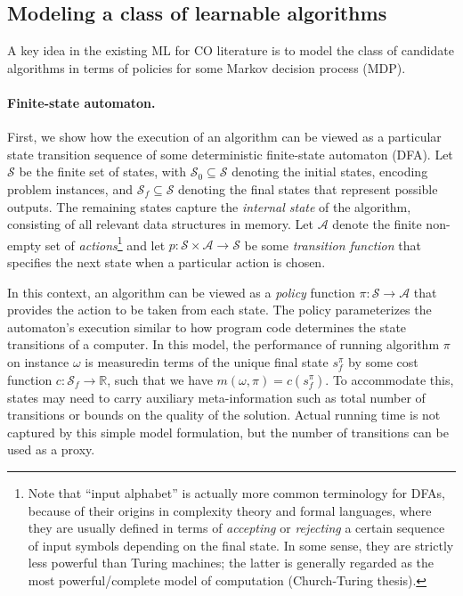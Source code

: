 \documentclass{report}
\theoremstyle{definition}
\theoremstyle{plain}
\begin{document}
\subsection{Modeling a class of learnable algorithms}

A key idea in the existing ML for CO literature is to model the class of
candidate algorithms in terms of policies for some Markov decision process
(MDP).

\paragraph{Finite-state automaton.}
First, we show how the execution of an algorithm can be viewed as a particular
state transition sequence of some deterministic finite-state automaton (DFA). Let
$\mathcal{S}$ be the finite set of states, with
$\mathcal{S}_0 \subseteq \mathcal{S}$ denoting the initial states, encoding
problem instances, and $\mathcal{S}_f \subseteq \mathcal{S}$ denoting the final
states that represent possible outputs. The remaining states capture the
\emph{internal state} of the algorithm, consisting of all relevant data
structures in memory.
%
Let $\mathcal{A}$ denote the finite non-empty set of \emph{actions}\footnote{Note that
  ``input alphabet'' is actually more common terminology for DFAs, because of
  their origins in complexity theory and formal languages, where they are
  usually defined in terms of \emph{accepting} or \emph{rejecting} a certain sequence of input
  symbols depending on the final state. In some sense, they are strictly less
  powerful than Turing machines; the latter is generally regarded as the most
  powerful/complete model of computation (Church-Turing thesis).}
%
and let $p : \mathcal{S} \times \mathcal{A} \to \mathcal{S}$ be some
\emph{transition function} that specifies the next state when a particular
action is chosen.

In this context, an algorithm can be viewed as a \emph{policy} function
$\pi : \mathcal{S} \rightarrow \mathcal{A}$ that provides the action to be taken
from each state.
%
The policy parameterizes the automaton’s execution similar to how program code
determines the state transitions of a computer.
%
In this model, the performance of running algorithm $\pi$ on instance $\omega$ is
measuredin terms of the unique final state $s_f^\pi$ by some
cost function $c : \mathcal{S}_f \rightarrow \mathbb{R}$, such that we have
$m(\omega,\pi) = c(s_f^\pi)$.
%
To accommodate this, states may need to carry auxiliary meta-information such as
total number of transitions or bounds on the quality of the solution. Actual
running time is not captured by this simple model formulation, but the number of
transitions can be used as a proxy.
\end{document}
